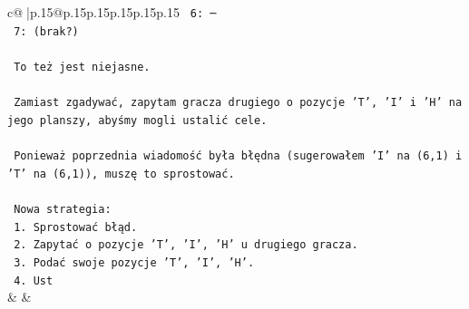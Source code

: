 \documentclass{article}
\begin{document}
{\begin{supertabular}{c@{$\;$}|p{.15\linewidth}@{}p{.15\linewidth}p{.15\linewidth}p{.15\linewidth}p{.15\linewidth}p{.15\linewidth}}
{{{\texttt{      6: ─} \\
\texttt{      7: (brak?)} \\
\\ 
\texttt{      To też jest niejasne.} \\
\\ 
\texttt{   Zamiast zgadywać, zapytam gracza drugiego o pozycje 'T', 'I' i 'H' na jego planszy, abyśmy mogli ustalić cele.} \\
\\ 
\texttt{   Ponieważ poprzednia wiadomość była błędna (sugerowałem 'I' na (6,1) i 'T' na (6,1)), muszę to sprostować.} \\
\\ 
\texttt{   Nowa strategia:} \\
\texttt{   1. Sprostować błąd.} \\
\texttt{   2. Zapytać o pozycje 'T', 'I', 'H' u drugiego gracza.} \\
\texttt{   3. Podać swoje pozycje 'T', 'I', 'H'.} \\
\texttt{   4. Ust} \\
            }
        }
    }
    & & \\ \\


\end{supertabular}}
\end{document}
